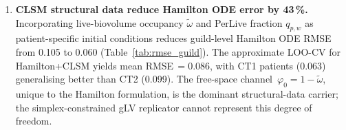 \documentclass[11pt,a4paper]{article}
\begin{document}
\begin{enumerate}[nosep,leftmargin=*]
(ii)~Bacilli$\to$Actinobacteria ($A=-1.27$) via hydrogen peroxide inhibition (\textit{S.~gordonii} H$_2$O$_2$ suppresses \textit{Actinomyces});
(iii)~Negativicutes$\to$Bacilli ($A=+0.89$) via CO$_2$ cross-feeding (\textit{Veillonella} CO$_2$ by-product sustains \textit{Streptococcus} CO$_2$-dependent growth).
Four of the top eight interactions by strength lack a direct SF1 record, marking gaps in metabolite annotation as candidates for experimental validation (Fig.~\ref{fig:top_interactions}).
Independently, manually curated minimal metabolic models (COBRApy pFBA, one per guild) achieve 6/7 (86\,\%) sign agreement with the inferred gLV signs (Fig.~\ref{fig:minimal_model_signs}), confirming the metabolic plausibility of the dominant interaction signs.
\item \textbf{CLSM structural data reduce Hamilton ODE error by 43\,\%.} Incorporating live-biovolume occupancy $\tilde\omega$ and PerLive fraction $q_{p,w}$ as patient-specific initial conditions reduces guild-level Hamilton ODE RMSE from 0.105 to 0.060 (Table~\ref{tab:rmse_guild}).
The approximate LOO-CV for Hamilton+CLSM yields mean RMSE\,$= 0.086$, with CT1 patients (0.063) generalising better than CT2 (0.099).
The free-space channel~$\varphi_0 = 1 - \tilde\omega$, unique to the Hamilton formulation, is the dominant structural-data carrier; the simplex-constrained gLV replicator cannot represent this degree of freedom.
\end{enumerate}
\end{document}
